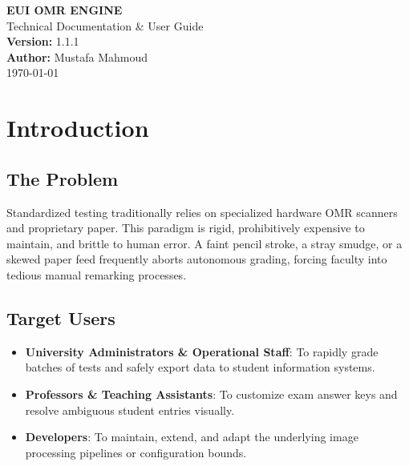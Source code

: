 \documentclass[12pt,a4paper]{article}
\begin{document}
\begin{titlepage}
    \centering
    \vspace*{4cm}
    {\Huge \textbf{EUI OMR ENGINE}} \\[0.5cm]
    {\LARGE Technical Documentation \& User Guide} \\[2cm]
    
    {\large \textbf{Version:}} 1.1.1 \\
    {\large \textbf{Author:}} Mustafa Mahmoud \\[2cm]
    
    \vfill
    {\large \today}
\end{titlepage}

\newpage
\tableofcontents
\newpage

\begin{abstract}
Educational grading at scale demands precision, speed, and reliability. The EUI Optical Mark Recognition (OMR) Engine resolves the persistent cost and inflexibility of legacy hardware scanners by providing a 100\% software-based, computer vision solution. This document comprehensively outlines the architecture, setup, algorithms, and operational usage of the EUI OMR Engine.
\end{abstract}

\section{Introduction}

\subsection{The Problem}
Standardized testing traditionally relies on specialized hardware OMR scanners and proprietary paper. This paradigm is rigid, prohibitively expensive to maintain, and brittle to human error. A faint pencil stroke, a stray smudge, or a skewed paper feed frequently aborts autonomous grading, forcing faculty into tedious manual remarking processes.

\subsection{Target Users}
\begin{itemize}
    \item \textbf{University Administrators \& Operational Staff}: To rapidly grade batches of tests and safely export data to student information systems.
    \item \textbf{Professors \& Teaching Assistants}: To customize exam answer keys and resolve ambiguous student entries visually.
    \item \textbf{Developers}: To maintain, extend, and adapt the underlying image processing pipelines or configuration bounds.
\end{itemize}
\end{document}
